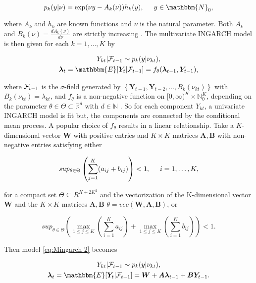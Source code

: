 \begin{equation}
p_{k}(y|\nu) = \exp(\nu y - A_k(\nu))h_k(y), \hspace{0.5cm} y \in \mathbbm{N}_0,
\label{eq:Exponential Family}
\end{equation}

where $A_k$ and $h_k$ are known functions and $\nu$ is the natural parameter. Both $A_k$ and $B_k(\nu) = \frac{d A_k(\nu)}{d \nu}$ are strictly increasing \cite{Lee:2023}. The multivariate INGARCH model is then given for each $k=1,\ldots,K$ by

\begin{equation}
\begin{gathered}
Y_{kt} | \SigA_{t-1} \sim p_k(y|\nu_{kt}), \\
\bm{\lambda}_t = \mathbbm{E}[\bm{Y}_t | \SigA_{t-1}] = f_{\theta}(\bm{\lambda}_{t-1},\bm{Y}_{t-1}),
\label{eq:Mingarch 2}
\end{gathered}
\end{equation}

where $\mathcal{F}_{t-1}$ is the $\sigma$-field generated by $\left\{\bm{Y}_{t-1},\bm{Y}_{t-2},\ldots,B_k(\nu_{kt})\right\}$ with $B_k(\nu_{kt})=\lambda_{kt}$, and $f_{\theta}$ is a non-negative function on $[0,\infty)^K \times \mathbb{N}_0^K$, depending on the parameter $\theta \in \Theta \subset \mathbb{R}^d$ with $d \in \mathbb{N}$ \cite{Lee:2023}. So for each component $Y_{kt}$, a univariate INGARCH model is fit but, the components are connected by the conditional mean process. A popular choice of $f_{\theta}$ results in a linear relationship. Take a $K$-dimensional vector $\bm{W}$ with positive entries and $K\times K$ matrices $\bm{A},\bm{B}$ with non-negative entries satisfying either \cite{Lee:2023}

\begin{equation}
sup_{\theta \in \Theta} \left(\sum_{j=1}^K(a_{ij}+b_{ij})\right) < 1, \hspace{0.5cm} i=1,\ldots,K , 
\label{eq:Mingarch 2 function condition 1}
\end{equation}

for a compact set $\Theta \subseteq R^{K+ 2K^2}$ and the vectorization of the K-dimensional vector $\bm{W}$ and the $K\times K$ matrices $\bm{A},\bm{B}$ $\theta=vec(\bm{W},\bm{A},\bm{B})$, or 

\begin{equation}
sup_{\theta \in \Theta}\left(\max_{1\leq j \leq K}(\sum_{i=1}^K a_{ij}) + \max_{1\leq j \leq K} \left(\sum_{i=1}^K b_{ij}\right)\right) < 1. 
\label{eq:Mingarch 2 function condition 2}
\end{equation}

Then model \ref{eq:Mingarch 2} becomes 

\begin{equation}
\begin{gathered}
Y_{kt} | \SigA_{t-1} \sim p_k(y|\nu_{kt}), \\
\bm{\lambda}_t = \mathbbm{E}[\bm{Y}_t | \SigA_{t-1}] = \bm{W} + \bm{A}\bm{\lambda}_{t-1} + \bm{B}\bm{Y}_{t-1}. 
\label{eq:Mingarch 2 linear}
\end{gathered}
\end{equation}

